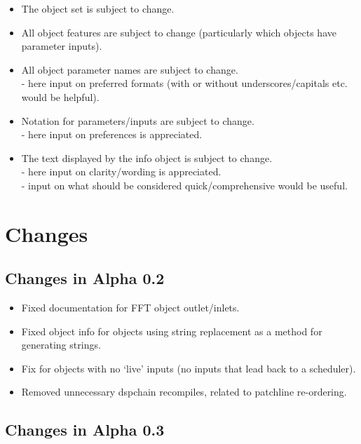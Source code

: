 \documentclass{article}
\begin{document}
 \begin{itemize}
\item{The object set is subject to change.}
\item{All object features are subject to change (particularly which objects have parameter inputs).}
\item{All object parameter names are subject to change. \\
 - here input on preferred formats (with or without underscores/capitals etc. would be helpful).}
\item{Notation for parameters/inputs are subject to change. \\
 - here input on preferences is appreciated.}
\item{The text displayed by the info object is subject to change. \\
 - here input on clarity/wording is appreciated. \\
 - input on what should be considered quick/comprehensive would be useful.}
  \end{itemize}
  
\pagebreak

\section{Changes}

\subsection{Changes in Alpha 0.2}
\vspace{0.1in}

\begin{itemize}
\item Fixed documentation for FFT object outlet/inlets.
\item Fixed object info for objects using string replacement as a method for generating strings.
\item Fix for objects with no `live' inputs (no inputs that lead back to a scheduler).
\item Removed unnecessary dspchain recompiles, related to patchline re-ordering.
\end{itemize}

\subsection{Changes in Alpha 0.3}
\vspace{0.1in}
\end{document}
